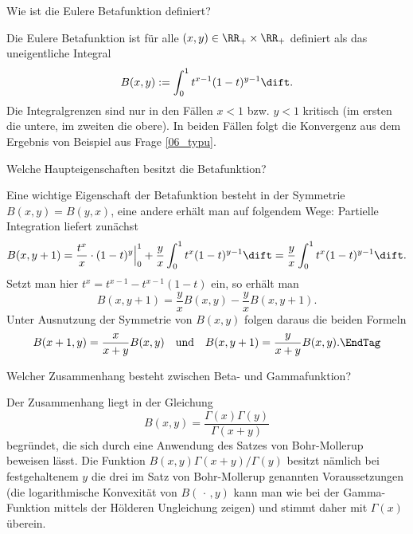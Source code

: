   \begin{frage}
    Wie ist die Euler\sch e Betafunktion definiert?
  \end{frage}

  \begin{antwort}
    Die Euler\sch e Betafunktion ist für alle 
    $(x,y)\in \RR_+ \times \RR_+$ definiert als das uneigentliche 
    Integral
    \[
    B(x,y) := \int_0^1 t^{x-1} (1-t)^{y-1} \dift. 
    \]
    Die Integralgrenzen sind nur in den Fällen $x<1$ bzw. $y<1$ 
    kritisch (im ersten die untere, im zweiten die obere). 
    In beiden Fällen folgt die Konvergenz aus 
    dem Ergebnis von Beispiel  aus Frage 
    \ref{06_typu}. 
  \end{antwort} 

  \begin{frage}
    Welche Haupteigenschaften besitzt 
    die Betafunktion?
  \end{frage}

  \begin{antwort}
    Eine wichtige Eigenschaft 
    der Betafunktion besteht in der 
    Symmetrie $B(x,y)=B(y,x)$, 
    eine andere erhält man auf folgendem Wege: Partielle 
    Integration liefert zunächst
    \[
    B(x,y+1)= \frac{t^x}{x}\cdot(1-t)^{y} \Big|_0^1 + 
    \frac{y}{x} \int_0^1 t^x (1-t)^{y-1} \dift
    =\frac{y}{x} \int_0^1 t^x (1-t)^{y-1} \dift.
    \]
    Setzt man hier $t^x=t^{x-1}-t^{x-1} ( 1-t )$ ein, 
    so erhält man
    \[
    B(x,y+1) = \frac{y}{x} B(x,y) - \frac{y}{x} B(x,y+1). 
    \]
    Unter Ausnutzung der Symmetrie von $B(x,y)$ 
    folgen daraus die beiden Formeln
    \[
    B(x+1,y)=\frac{x}{x+y} B(x,y) \quad\text{und}\quad 
    B(x,y+1)=\frac{y}{x+y} B(x,y).\EndTag
    \]
  \end{antwort}

  \begin{frage}
    Welcher Zusammenhang besteht zwischen Beta- und Gammafunktion?
  \end{frage}

  \begin{antwort}
    Der Zusammenhang liegt in der Gleichung 
    \[
    B(x,y)=\frac{\Gamma(x)\Gamma(y)}{\Gamma(x+y)} 
    \]
    begründet, die sich durch eine Anwendung des Satzes 
    von Bohr-Mollerup beweisen lässt. 
    Die Funktion $B(x,y)\Gamma(x+y)/\Gamma(y)$ besitzt nämlich bei 
    festgehaltenem $y$ die drei im Satz von 
    Bohr-Mollerup genannten Voraussetzungen 
    (die logarithmische Konvexität von 
    $B(\,\cdot\,,y)$ kann man wie 
    bei der Gamma-Funktion mittels der Hölder\sch en Ungleichung zeigen)  
    und stimmt daher mit $\Gamma(x)$ 
    überein. \AntEnd
  \end{antwort}


